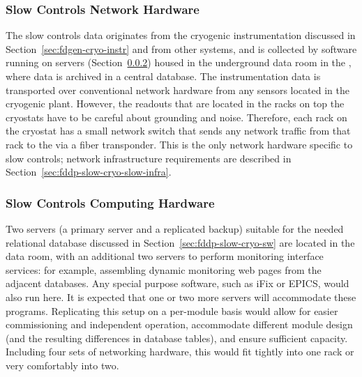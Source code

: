 \subsubsection{Slow Controls Network Hardware}
\label{sec:fddp-slow-cryo-slow-network}
The slow controls data originates from the cryogenic instrumentation discussed in
Section~\ref{sec:fdgen-cryo-instr} and from other systems,
and is collected by software running on servers
(Section~\ref{sec:fddp-slow-cryo-slow-compute})
housed in the underground data room in the ,
where data is archived in a central  database.
The instrumentation data is transported over
conventional network hardware from any sensors located in the cryogenic
plant.  However, the readouts that are located in the racks on top the
cryostats have to be careful about grounding and noise.  Therefore, each
rack on the cryostat has a small network switch that sends
any network traffic from that rack to the  via a fiber transponder.
This is the only network hardware specific to slow controls;
network infrastructure requirements are described in
Section~\ref{sec:fddp-slow-cryo-slow-infra}.

\subsubsection{Slow Controls Computing Hardware}
\label{sec:fddp-slow-cryo-slow-compute}

Two servers (a primary server and a replicated backup) suitable for the needed relational database discussed
in Section~\ref{sec:fddp-slow-cryo-sw} are located in the  data
room, with an additional
two servers to perform  monitoring interface services: for
example, assembling dynamic  monitoring web pages from the adjacent
databases.  Any special purpose software, such as iFix or EPICS, would
also run here. It is expected that one or two more servers will accommodate
these programs.
Replicating this setup on a per-module basis would allow for easier
commissioning and independent operation, accommodate different module
design (and the resulting differences in database tables), and ensure
sufficient capacity.  Including four sets of networking hardware, this
would fit tightly into one rack or very comfortably into two.






